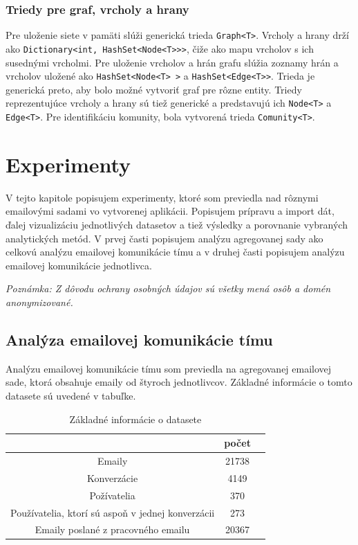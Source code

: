 \documentclass[slovak,master,public,dept460,male,cpdeclaration,oneside]{diploma}
\begin{document}
\subsubsection{Triedy pre graf, vrcholy a hrany}
Pre uloženie siete v pamäti slúži generická trieda \texttt{Graph<T>}. Vrcholy a hrany drží ako \texttt{Dictionary<int, HashSet<Node<T>{}>{}>}, čiže ako mapu vrcholov s ich susednými vrcholmi. Pre uloženie vrcholov a hrán grafu slúžia zoznamy hrán a vrcholov uložené ako \texttt{HashSet<Node<T> >} a \texttt{HashSet<Edge<T>{}>}. Trieda je generická preto, aby bolo možné vytvoriť graf pre rôzne entity. Triedy reprezentujúce vrcholy a hrany sú tiež generické a predstavujú ich \texttt{Node<T>} a \texttt{Edge<T>}. Pre identifikáciu komunity, bola vytvorená trieda \texttt{Comunity<T>}.



\section{Experimenty}
V tejto kapitole popisujem experimenty, ktoré som previedla nad rôznymi emailovými sadami vo vytvorenej aplikácii. Popisujem prípravu a import dát, ďalej vizualizáciu jednotlivých datasetov a tiež výsledky a porovnanie vybraných analytických metód. V prvej časti popisujem analýzu agregovanej sady ako celkovú analýzu emailovej komunikácie tímu a v druhej časti popisujem analýzu emailovej komunikácie jednotlivca.

\noindent \textit{Poznámka: Z dôvodu ochrany osobných údajov sú všetky mená osôb a domén anonymizované.}


\subsection{Analýza emailovej komunikácie tímu}

Analýzu emailovej komunikácie tímu som previedla na agregovanej emailovej sade, ktorá obsahuje emaily od štyroch jednotlivcov. Základné informácie o tomto datasete sú uvedené v tabuľke. 

\begin{table}[h!]
\centering
\begin{tabular}{ c c c }
  &  počet \\ 
 \hline
 Emaily  & 21738 \\  
 Konverzácie  & 4149  \\
 Požívatelia  & 370 \\
 Používatelia, ktorí sú aspoň v jednej konverzácii  & 273 \\  
 Emaily poslané z pracovného emailu  & 20367  \\
\end{tabular}
\caption{Základné informácie o datasete}
\label{tabulkazaklinfo}
\end{table} 
\end{document}
